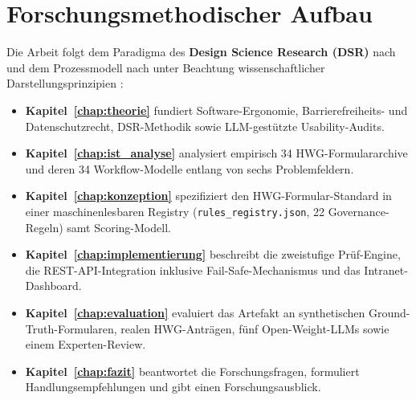 \section{Forschungsmethodischer Aufbau}
\label{sec:aufbau}

Die Arbeit folgt dem Paradigma des \textbf{Design Science Research (DSR)} nach \textcite{hevner2004design} und dem Prozessmodell nach \textcite{peffers2007design} unter Beachtung wissenschaftlicher Darstellungsprinzipien \parencite{recker2013scientific, cochrane2005writing, kornmeier2011}:
\begin{itemize}
    \item \textbf{Kapitel~\ref{chap:theorie}} fundiert Software-Ergonomie, Barrierefreiheits- und Datenschutzrecht, DSR-Methodik sowie LLM-gestützte Usability-Audits.
    \item \textbf{Kapitel~\ref{chap:ist_analyse}} analysiert empirisch 34 HWG-Formulararchive und deren 34 Workflow-Modelle entlang von sechs Problemfeldern.
    \item \textbf{Kapitel~\ref{chap:konzeption}} spezifiziert den HWG-Formular-Standard in einer maschinenlesbaren Registry (\texttt{rules\_registry.json}, 22 Governance-Regeln) samt Scoring-Modell.
    \item \textbf{Kapitel~\ref{chap:implementierung}} beschreibt die zweistufige Prüf-Engine, die REST-API-Integration inklusive Fail-Safe-Mechanismus und das Intranet-Dashboard.
    \item \textbf{Kapitel~\ref{chap:evaluation}} evaluiert das Artefakt an synthetischen Ground-Truth-Formularen, realen HWG-Anträgen, fünf Open-Weight-LLMs sowie einem Experten-Review.
    \item \textbf{Kapitel~\ref{chap:fazit}} beantwortet die Forschungsfragen, formuliert Handlungsempfehlungen und gibt einen Forschungsausblick.
\end{itemize}
